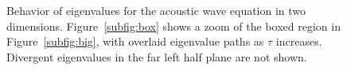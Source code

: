 \documentclass[10pt]{article}
\begin{document}
\begin{figure}
\centering
{}
\hspace{2em}
\caption{Behavior of eigenvalues for the acoustic wave equation in two dimensions.  Figure~\ref{subfig:box} shows a zoom of the boxed region in Figure~\ref{subfig:big}, with overlaid eigenvalue paths as $\tau$ increases.  Divergent eigenvalues in the far left half plane are not shown.  }
\label{fig:trackEigsWave}
\end{figure}
\end{document}
